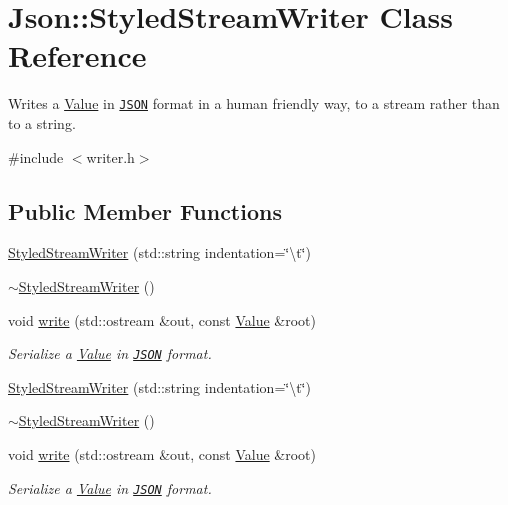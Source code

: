 \hypertarget{classJson_1_1StyledStreamWriter}{\section{Json\-:\-:Styled\-Stream\-Writer Class Reference}
\label{d8/dc0/classJson_1_1StyledStreamWriter}
}


Writes a \hyperlink{classJson_1_1Value}{Value} in \href{http://www.json.org}{\tt J\-S\-O\-N} format in a human friendly way, to a stream rather than to a string.  




{\ttfamily \#include $<$writer.\-h$>$}

\subsection*{Public Member Functions}
\begin{DoxyCompactItemize}
\item 
\hyperlink{classJson_1_1StyledStreamWriter_ae87567a08de865b6dc84d7218a3001df}{Styled\-Stream\-Writer} (std\-::string indentation=\char`\"{}\textbackslash{}t\char`\"{})
\item 
\hyperlink{classJson_1_1StyledStreamWriter_a17444a59f617970279714e97b0ddfa46}{$\sim$\-Styled\-Stream\-Writer} ()
\item 
void \hyperlink{classJson_1_1StyledStreamWriter_a07807741c6c43ecd35885a87234d0805}{write} (std\-::ostream \&out, const \hyperlink{classJson_1_1Value}{Value} \&root)
\begin{DoxyCompactList}\small\item\em Serialize a \hyperlink{classJson_1_1Value}{Value} in \href{http://www.json.org}{\tt J\-S\-O\-N} format. \end{DoxyCompactList}\item 
\hyperlink{classJson_1_1StyledStreamWriter_ae87567a08de865b6dc84d7218a3001df}{Styled\-Stream\-Writer} (std\-::string indentation=\char`\"{}\textbackslash{}t\char`\"{})
\item 
\hyperlink{classJson_1_1StyledStreamWriter_a17444a59f617970279714e97b0ddfa46}{$\sim$\-Styled\-Stream\-Writer} ()
\item 
void \hyperlink{classJson_1_1StyledStreamWriter_a07807741c6c43ecd35885a87234d0805}{write} (std\-::ostream \&out, const \hyperlink{classJson_1_1Value}{Value} \&root)
\begin{DoxyCompactList}\small\item\em Serialize a \hyperlink{classJson_1_1Value}{Value} in \href{http://www.json.org}{\tt J\-S\-O\-N} format. \end{DoxyCompactList}\end{DoxyCompactItemize}

